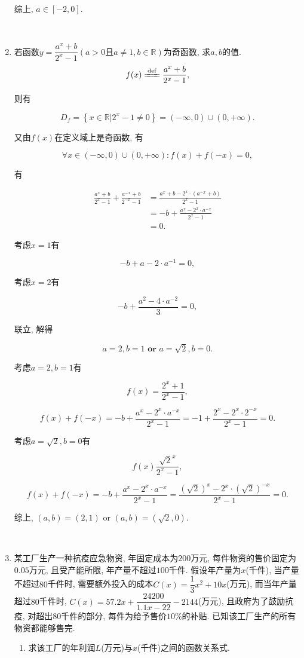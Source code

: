 \documentclass[8pt]{article}
\begin{document}
\begin{enumerate}[label=\arabic*.]
			综上, $a\in[-2, 0].$

		~\\

		\item 若函数$y=\dfrac{a^x+b}{2^x-1} (a>0\text{且}a\neq 1, b\in\mathbb{R})$为奇函数, 求$a, b$的值.
			~\\

			$$f(x)\xlongequal{\mathrm{def}}\frac{a^x+b}{2^x-1},$$

			则有

			$$D_f=\left\{x\in\mathbb{R}|2^x-1\neq 0\right\}=(-\infty, 0)\cup(0, +\infty).$$

			又由$f(x)$在定义域上是奇函数, 有

			$$\forall x\in (-\infty, 0)\cup(0, +\infty): f(x)+f(-x)=0,$$

			有

			\begin{align*}
				\frac{a^x+b}{2^x-1}+\frac{a^{-x}+b}{2^{-x}-1}&=\frac{a^x+b-2^x\cdot\left(a^{-x}+b\right)}{2^x-1}\\
				&=-b+\frac{a^x-2^x\cdot a^{-x}}{2^x-1}\\
				&=0.
			\end{align*}

			考虑$x=1$有

			$$-b+a-2\cdot a^{-1}=0,$$

			考虑$x=2$有

			$$-b+\frac{a^2-4\cdot a^{-2}}{3}=0,$$

			联立, 解得

			$$a=2, b=1 \textbf{ or } a=\sqrt{2}, b=0.$$

			考虑$a=2, b=1$有

			$$f(x)=\frac{2^x+1}{2^x-1},$$

			$$f(x)+f(-x)=-b+\frac{a^x-2^x\cdot a^{-x}}{2^x-1}=-1+\frac{2^x-2^x\cdot 2^{-x}}{2^x-1}=0.$$

			考虑$a=\sqrt{2}, b=0$有

			$$f(x)\frac{\sqrt{2}^x}{2^x-1},$$

			$$f(x)+f(-x)=-b+\frac{a^x-2^x\cdot a^{-x}}{2^x-1}=\frac{(\sqrt{2})^x-2^x\cdot (\sqrt{2})^{-x}}{2^x-1}=0.$$

			综上, $(a,b)=(2, 1)$ or $(a,b)=(\sqrt{2}, 0).$

		~\\

		\item 某工厂生产一种抗疫应急物资, 年固定成本为$200$万元, 每件物资的售价固定为$0.05$万元, 且受产能所限, 年产量不超过$100$千件. 假设年产量为$x$(千件), 当产量不超过$80$千件时, 需要额外投入的成本$C(x)=\dfrac{1}{3}x^2+10x$(万元), 而当年产量超过$80$千件时, $C(x)=57.2x+\dfrac{24200}{1.1x-22}-2144$(万元), 且政府为了鼓励抗疫, 对超出$80$千件的部分, 每件为给予售价$10\%$的补贴. 已知该工厂生产的所有物资都能够售完.
			\begin{enumerate}[label=(\arabic*)]
				\item 求该工厂的年利润$L$(万元)与$x$(千件)之间的函数关系式.
					~\\


\end{enumerate}
\end{enumerate}
\end{document}
